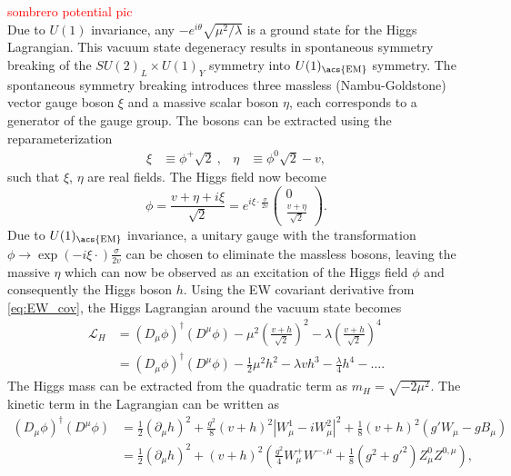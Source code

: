 \documentclass[../thesis.tex]{subfiles}
\begin{document}
\textcolor{red}{sombrero potential pic}\\
Due to $U(1)$ invariance, any $-e^{i\theta}\sqrt{\mu^2/\lambda}$ is a ground state for the Higgs Lagrangian. This vacuum state degeneracy results in spontaneous symmetry breaking of the $SU(2)_L\times U(1)_Y$ symmetry into $U(1)_\text{\acs{EM}}$ symmetry. The spontaneous symmetry breaking introduces three massless (Nambu-Goldstone) vector gauge boson $\xi$ and a massive scalar boson $\eta$, each corresponds to a generator of the gauge group. The bosons can be extracted using the reparameterization \citep{theory:higgs_physics}
\begin{align}
\xi  &\equiv \phi^+\sqrt{2}
\  ,&
\eta &\equiv \phi^0\sqrt{2}-v,
\end{align}
such that $\xi$, $\eta$ are real fields. The Higgs field now become
\begin{equation}
\phi=\frac{v+\eta+i\xi}{\sqrt{2}}=e^{i\xi\cdot\displaystyle\frac{\sigma}{2v}}
\begin{pmatrix}
0 \\ \displaystyle\frac{v+\eta}{\sqrt{2}}
\end{pmatrix}.
\end{equation}
Due to $U(1)_\text{\acs{EM}}$ invariance, a unitary gauge with the transformation $\phi \rightarrow \exp(-i\xi\cdot)\frac{\sigma}{2v}$ can be chosen to eliminate the massless bosons, leaving the massive $\eta$ which can now be observed as an excitation of the Higgs field $\phi$ and consequently the Higgs boson $h$. Using the \acs{EW} covariant derivative from \autoref{eq:EW_cov}, the Higgs Lagrangian around the vacuum state becomes
\begin{equation}
\begin{aligned}
\mathcal{L}_H &= \left(D_\mu\phi\right)^\dagger \left(D^\mu\phi\right) - \mu^2\left(\displaystyle\frac{v+h}{\sqrt{2}}\right)^2-\lambda\left(\displaystyle\frac{v+h}{\sqrt{2}}\right)^4 \\
&= \left(D_\mu\phi\right)^\dagger \left(D^\mu\phi\right) - \frac{1}{2}\mu^2h^2 - \lambda v h^3 - \frac{\lambda}{4} h^4 - \ldots.
\end{aligned}
\end{equation}
The Higgs mass can be extracted from the quadratic term as $m_H = \sqrt{-2\mu^2}$. The kinetic term in the Lagrangian can be written as
\begin{equation}
\begin{aligned}
\left(D_\mu\phi\right)^\dagger \left(D^\mu\phi\right) 
&= \frac{1}{2}(\partial_\mu h)^2 + \frac{g^2}{8}(v+h)^2\left|W^1_\mu -iW^2_\mu\right|^2 + \frac{1}{8}(v+h)^2\left(g'W_\mu-gB_\mu\right) \\
&= \frac{1}{2}(\partial_\mu h)^2 + (v+h)^2 \left( \frac{g^2}{4}W^{+}_{\mu} W^{-,\mu }+\frac{1}{8} \left(g^2+g'^2\right)Z^{0}_{\mu} Z^{0,\mu} \right),
\end{aligned}
\end{equation}
\end{document}
